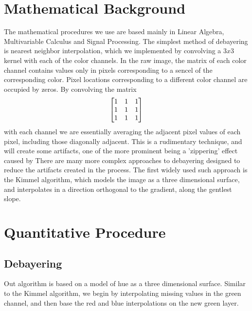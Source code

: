 \documentclass{article}\twocolumn
\begin{document}
\section{Mathematical Background}
The mathematical procedures we use are based mainly in Linear Algebra, Multivariable Calculus and Signal Processing. The simplest method of debayering is nearest neighbor interpolation, which we implemented by convolving a  $3x3$ kernel with each of the color channels. In the raw image, the matrix of each color channel contains values only in pixels corresponding to a sencel of the corresponding color. Pixel locations corresponding to a different color channel are occupied by zeros. By convolving the matrix 
    \begin{align}
        \begin{bmatrix} 1 & 1 & 1 \\ 1 & 1 & 1 \\ 1 & 1 & 1 \end{bmatrix}
    \end{align}
with each channel we are essentially averaging the adjacent pixel values of each pixel, including those diagonally adjacent. This is a rudimentary technique, and will create some artifacts, one of the more prominent being a 'zippering' effect caused by %
There are many more complex approaches to debayering designed to reduce the artifacts created in the process. The first widely used such approach is the Kimmel algorithm, which models the image as a three dimensional surface, and interpolates in a direction orthogonal to the gradient, along the gentlest slope.

\section{Quantitative Procedure}

\subsection{Debayering}
    Out algorithm is based on a model of hue as a three dimensional surface. Similar to the Kimmel algorithm, we begin by interpolating missing values in the green channel, and then base the red and blue interpolations on the new green layer. 
    
    
    
\end{document}
